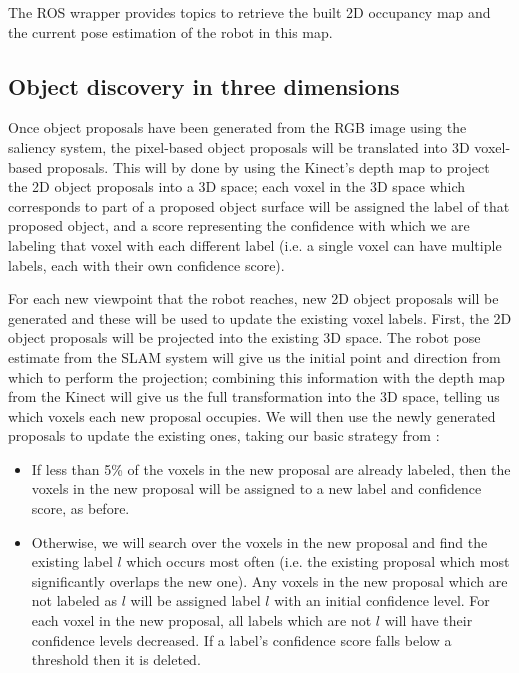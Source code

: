 \documentclass[a4paper,11pt,english]{article}
\begin{document}
The ROS wrapper provides topics to retrieve the built 2D occupancy map and the current pose estimation of the robot in this map.

\subsection{Object discovery in three dimensions}
\label{system:fusion}
Once object proposals have been generated from the RGB image using the saliency system, the pixel-based object proposals will be translated into 3D voxel-based proposals.
This will by done by using the Kinect's depth map to project the 2D object proposals into a 3D space; each voxel in the 3D space which corresponds to part of a proposed object surface will be assigned the label of that proposed object, and a score representing the confidence with which we are labeling that voxel with each different label (i.e. a single voxel can have multiple labels, each with their own confidence score).

For each new viewpoint that the robot reaches, new 2D object proposals will be generated and these will be used to update the existing voxel labels.
First, the 2D object proposals will be projected into the existing 3D space.
The robot pose estimate from the SLAM system will give us the initial point and direction from which to perform the projection; combining this information with the depth map from the Kinect will give us the full transformation into the 3D space, telling us which voxels each new proposal occupies.
We will then use the newly generated proposals to update the existing ones, taking our basic strategy from \cite{garcia2013computational}:

\begin{itemize}
	\item If less than 5\% of the voxels in the new proposal are already labeled, then the voxels in the new proposal will be assigned to a new label and confidence score, as before.
	\item Otherwise, we will search over the voxels in the new proposal and find the existing label \(l\) which occurs most often (i.e. the existing proposal which most significantly overlaps the new one).
	Any voxels in the new proposal which are not labeled as \(l\) will be assigned label \(l\) with an initial confidence level.
	For each voxel in the new proposal, all labels which are not \(l\) will have their confidence levels decreased.
	If a label's confidence score falls below a threshold then it is deleted.
\end{itemize}
\end{document}
